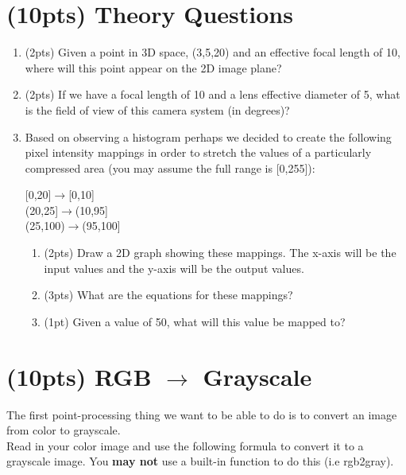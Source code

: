 \documentclass[12pt]{article}
\begin{document}
\section{(10pts) Theory Questions}
\begin{enumerate}
\item (2pts) Given a point in 3D space, (3,5,20) and an effective focal length of 10, where will this point appear on the 2D image plane?

\item (2pts) If we have a focal length of 10 and a lens effective diameter of 5, what is the field of view of this camera system (in degrees)?

\item   Based on observing a histogram perhaps we decided to create the following pixel intensity mappings in order to stretch the values of a particularly compressed area (you may assume the full range is [0,255]):\\

\begin{center}
[0,20]$\rightarrow$[0,10]\\
(20,25]$\rightarrow$(10,95]\\
(25,100)$\rightarrow$(95,100]
\end{center}

\begin{enumerate}
\item(2pts) Draw a 2D graph showing these mappings.  The x-axis will be the input values and the y-axis will be the output values.

\item (3pts) What are the equations for these mappings?

\item (1pt) Given a value of 50, what will this value be mapped to?
\end{enumerate}
\end{enumerate}


\newpage
\section{(10pts) RGB $\rightarrow$ Grayscale}
The first point-processing thing we want to be able to do is to convert an image from color to grayscale.\\

\noindent
Read in your color image and use the following formula to convert it to a grayscale image.  You \textbf{may not} use a built-in function to do this (i.e rgb2gray).\\
\end{document}

